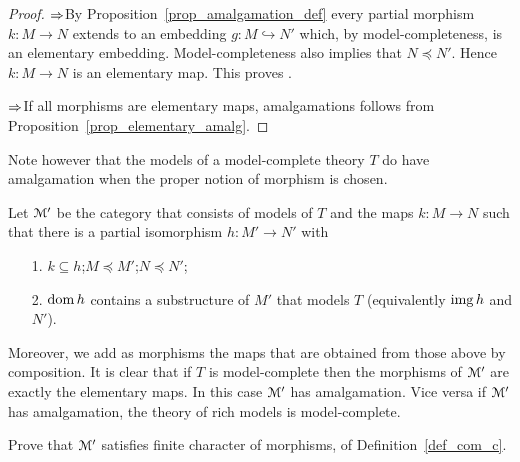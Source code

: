 \begin{proof}
$\Rightarrow$\quad By Proposition~\ref{prop_amalgamation_def} every partial morphism $k:M\to N$ extends to an embedding $g : M\hookrightarrow N'$ which, by model-completeness, is an elementary embedding. Model-completeness also implies that $N\preceq N'$. Hence $k:M\to N$ is an elementary map. This proves .

$\Rightarrow$\quad If all morphisms are elementary maps, amalgamations follows from Proposition~\ref{prop_elementary_amalg}.
\end{proof}

Note however that the models of a model-complete theory $T$ do have amalgamation when the proper notion of morphism is chosen. 

Let $\EuScript M'$ be the category that consists of models of $T$ and the maps $k:M\to N$ such that there is a  partial isomorphism $h:M'\to N'$ with 
\begin{itemize}
\item[1.] $k\subseteq h$;\quad $M\preceq M'$;\quad  $N\preceq N'$;

\item[2.] $\mathop{\rm dom} h$ contains a substructure of $M'$ that models $T$ (equivalently $\mathop{\rm img} h$ and $N'$).
\end{itemize}

Moreover, we add as morphisms the maps that are obtained from those above by composition. It is clear that if $T$ is model-complete then the morphisms of $\EuScript M'$ are exactly the elementary maps. In this case $\EuScript M'$ has amalgamation. Vice versa if $\EuScript M'$ has amalgamation, the theory of rich models is model-complete.

\begin{exercise}
Prove that $\EuScript M'$ satisfies finite character of morphisms,  of Definition~\ref{def_com_c}.\QED
\end{exercise}








